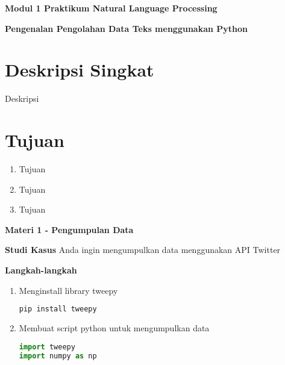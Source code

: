 \documentclass{article}
\begin{document}
    \begin{center}
        \textbf{Modul 1 Praktikum Natural Language Processing}

        \textbf{Pengenalan Pengolahan Data Teks menggunakan Python}
    \end{center}

    \section*{Deskripsi Singkat}
    Deskripsi

    \section*{Tujuan}
    \begin{enumerate}
        \item Tujuan
        \item Tujuan
        \item Tujuan
    \end{enumerate}

    \begin{flushleft}
        \textbf{Materi 1 - Pengumpulan Data}
        \newline
        
        \textbf{Studi Kasus}
        \newline
        Anda ingin mengumpulkan data menggunakan API Twitter
        \newline

        \textbf{Langkah-langkah}

        \begin{enumerate}
            \item Menginstall library tweepy
            \lstset{style=bashstyle}
            \begin{lstlisting}[language=bash]
pip install tweepy
            \end{lstlisting}

            \item Membuat script python untuk mengumpulkan data
            \lstset{style=pythonstyle}
            \begin{lstlisting}[language=python]
import tweepy
import numpy as np

            \end{lstlisting}
        \end{enumerate}
    \end{flushleft}
\end{document}
